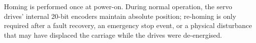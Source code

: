 Homing is performed once at power-on. During normal operation, the servo drives' internal 20-bit encoders maintain absolute position; re-homing is only required after a fault recovery, an emergency stop event, or a physical disturbance that may have displaced the carriage while the drives were de-energised.